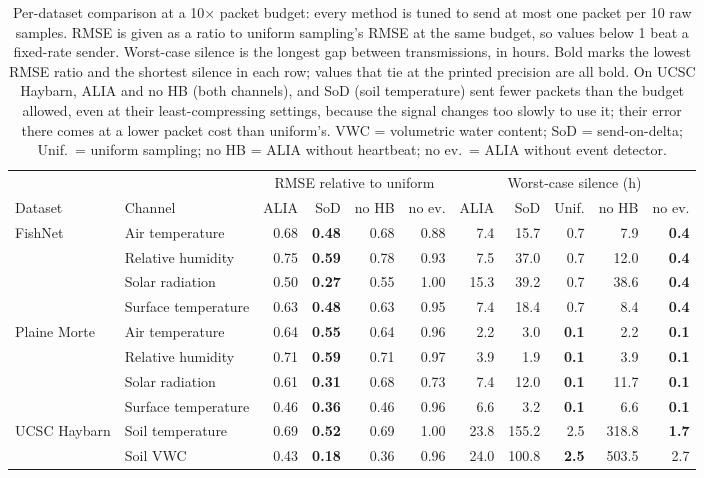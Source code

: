 \begin{table}[htbp]
\centering
\footnotesize
\setlength{\tabcolsep}{3pt}
\begin{adjustbox}{max width=\textwidth}
\begin{tabular}{llrrrrrrrrr}
\toprule
 & & \multicolumn{4}{c}{RMSE relative to uniform} & \multicolumn{5}{c}{Worst-case silence (h)} \\
\cmidrule(lr){3-6}\cmidrule(lr){7-11}
Dataset & Channel & ALIA & SoD & no HB & no ev. & ALIA & SoD & Unif. & no HB & no ev. \\
\midrule
\multirow{4}{*}{FishNet} & Air temperature & 0.68 & \textbf{0.48} & 0.68 & 0.88 & 7.4 & 15.7 & 0.7 & 7.9 & \textbf{0.4} \\
 & Relative humidity & 0.75 & \textbf{0.59} & 0.78 & 0.93 & 7.5 & 37.0 & 0.7 & 12.0 & \textbf{0.4} \\
 & Solar radiation & 0.50 & \textbf{0.27} & 0.55 & 1.00 & 15.3 & 39.2 & 0.7 & 38.6 & \textbf{0.4} \\
 & Surface temperature & 0.63 & \textbf{0.48} & 0.63 & 0.95 & 7.4 & 18.4 & 0.7 & 8.4 & \textbf{0.4} \\
\midrule
\multirow{4}{*}{Plaine Morte} & Air temperature & 0.64 & \textbf{0.55} & 0.64 & 0.96 & 2.2 & 3.0 & \textbf{0.1} & 2.2 & \textbf{0.1} \\
 & Relative humidity & 0.71 & \textbf{0.59} & 0.71 & 0.97 & 3.9 & 1.9 & \textbf{0.1} & 3.9 & \textbf{0.1} \\
 & Solar radiation & 0.61 & \textbf{0.31} & 0.68 & 0.73 & 7.4 & 12.0 & \textbf{0.1} & 11.7 & \textbf{0.1} \\
 & Surface temperature & 0.46 & \textbf{0.36} & 0.46 & 0.96 & 6.6 & 3.2 & \textbf{0.1} & 6.6 & \textbf{0.1} \\
\midrule
\multirow{2}{*}{UCSC Haybarn} & Soil temperature & 0.69 & \textbf{0.52} & 0.69 & 1.00 & 23.8 & 155.2 & 2.5 & 318.8 & \textbf{1.7} \\
 & Soil VWC & 0.43 & \textbf{0.18} & 0.36 & 0.96 & 24.0 & 100.8 & \textbf{2.5} & 503.5 & 2.7 \\
\bottomrule
\end{tabular}
\end{adjustbox}
\normalsize
\caption[Per-dataset comparison of ALIA against baselines and ablations]{%
Per-dataset comparison at a 10$\times$ packet budget: every method is tuned to send at most one packet per 10 raw samples. RMSE is given as a ratio to uniform sampling's RMSE at the same budget, so values below 1 beat a fixed-rate sender. Worst-case silence is the longest gap between transmissions, in hours. Bold marks the lowest RMSE ratio and the shortest silence in each row; values that tie at the printed precision are all bold. On UCSC Haybarn, ALIA and no HB (both channels), and SoD (soil temperature) sent fewer packets than the budget allowed, even at their least-compressing settings, because the signal changes too slowly to use it; their error there comes at a lower packet cost than uniform's. VWC = volumetric water content; SoD = send-on-delta; Unif.\ = uniform sampling; no HB = ALIA without heartbeat; no ev.\ = ALIA without event detector.}
\label{tab:per-dataset}
\end{table}
